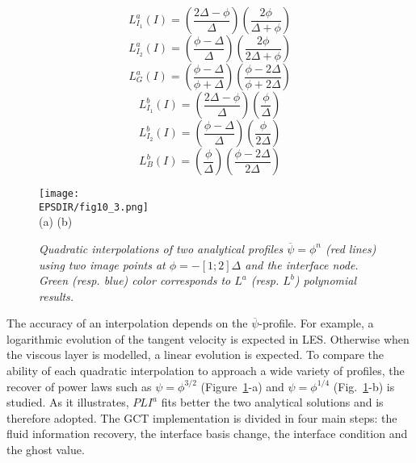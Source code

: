 \vspace{-0.25cm}
\begin{equation}
	L^{a}_{I_1}(I)=\left( \frac{2\Delta -\phi}{\Delta }     \right) \left( \frac{2\phi}{\Delta +\phi}          \right)
\end{equation} 
\begin{equation}
	L^{a}_{I_2}(I)=\left( \frac{\phi-\Delta }{\Delta }      \right) \left( \frac{2\phi}{2\Delta +\phi}         \right)
\end{equation} 
\begin{equation}
	L^{a}_{G}(I)  =\left( \frac{\phi-\Delta }{\phi+\Delta } \right) \left( \frac{\phi-2\Delta }{\phi+2\Delta } \right)
\end{equation} 
\begin{equation}	
	L^{b}_{I_1}(I)=\left( \frac{2\Delta -\phi}{\Delta } \right) \left( \frac{\phi}{\Delta}            \right)
\end{equation} 
\begin{equation}
	L^{b}_{I_2}(I)=\left( \frac{\phi-\Delta }{\Delta }  \right) \left( \frac{\phi}{2\Delta}           \right)
\end{equation} 
\begin{equation}		
	L^{b}_{B}(I)  =\left( \frac{\phi}{\Delta}           \right) \left( \frac{\phi-2\Delta }{2\Delta } \right)  
\end{equation} 
\vspace{-0.25cm}

\begin{figure}[!ht]
	\begin{center}
		\texttt{[image: \\EPSDIR/fig10\_3.png]} \\
		\vspace{-1mm} 	(a) \hspace{7cm} (b) 
		\small \caption {{\it Quadratic interpolations of two analytical profiles $\overline{\psi}=\phi^n$ (red lines) using two image points at $\phi=-[1;2]\Delta$ and the interface node. Green (resp. blue) color corresponds to $L^{a}$ (resp. $L^{b}$) polynomial results.}}
		\label{A_lag1D}	
	\end{center}
\end{figure}

The accuracy of an interpolation depends on the $\overline{\psi}$-profile. For example, a logarithmic evolution of the tangent velocity is expected in LES. Otherwise when the viscous layer is modelled, a linear evolution is expected. To compare the ability of each quadratic interpolation to approach a wide variety of profiles, the recover of power laws such as $\psi=\phi^{3/2}$ (Figure~\ref{A_lag1D}-a) and $\psi=\phi^{1/4}$ (Fig.~\ref{A_lag1D}-b) is studied. As it illustrates, $PLI^{a}$ fits better the two analytical solutions and is therefore adopted. The GCT implementation is divided in four main steps: the fluid information recovery, the interface basis change, the interface condition and the ghost value.\\

